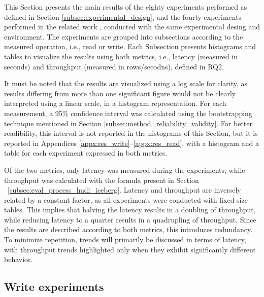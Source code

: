 
This Section presents the main results of the eighty experiments performed as defined in Section \ref{subsec:experimental_design}, and the fourty experiments performed in the related work \cite{manfrediReducingReadWrite2024}, conducted with the same experimental desing and environment. The experiments are grouped into subsections according to the measured operation, i.e., read or write. Each Subsection presents histograms and tables to visualize the results using both metrics, i.e., latency (measured in seconds) and throughput (measured in rows/secodns), defined in \gls{RQ}2.

It must be noted that the results are visualized using a log scale for clarity, as results differing from more than one significant figure would not be clearly interpreted using a linear scale, in a histogram representation. For each measurement, a 95\% confidence interval was calculated using the bootstrapping technique mentioned in Section \ref{subsec:method_reliability_validity}. For better readibility, this interval is not reported in the histograms of this Section, but it is reported in Appendices \ref{appx:res_write}--\ref{appx:res_read}, with a histogram and a table for each experiment expressed in both metrics.

Of the two metrics, only latency was measured during the experiments, while throughput was calculated with the formula present in Section ~\ref{subsec:eval_process_hudi_iceberg}. Latency and throughput are inversely related by a constant factor, as all experiments were conducted with fixed-size tables. This implies that halving the latency results in a doubling of throughput, while reducing latency to a quarter results in a quadrupling of throughput. Since the results are described according to both metrics, this introduces redundancy. To minimize repetition, trends will primarily be discussed in terms of latency, with throughput trends highlighted only when they exhibit significantly different behavior.



\subsection{Write experiments}

